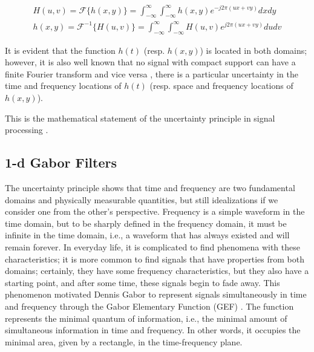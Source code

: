 \documentclass[journal]{IEEEtran}
\begin{document}
\begin{equation}\label{eq:fourier_transforms_2d}
    \begin{gathered}
        H(u, v) = \mathcal{F}\{h(x, y)\} = \int_{-\infty}^{\infty} \int_{-\infty}^{\infty} h(x, y) e^{-j2\pi (ux + vy)} dx dy \\
        h(x, y) = \mathcal{F}^{-1}\{H(u, v)\} = \int_{-\infty}^{\infty} \int_{-\infty}^{\infty}  H(u, v) e^{j2\pi (ux + vy)} du dv 
    \end{gathered}
\end{equation}


It is evident that the function $h(t)$ (resp. $h(x, y)$) is located in both domains; however, it is also well known that no signal with compact support can have a finite Fourier transform and vice versa \cite{Bracewell:FourierBook:1999}, there is a particular uncertainty in the time and frequency locations of $h(t)$ (resp. space and frequency locations of $h(x, y)$).

This is the mathematical statement of the uncertainty principle in signal processing \cite{Petrou.Sevilla:Book:2006}.

\subsection{1-d Gabor Filters}
The uncertainty principle shows that time and frequency are two fundamental domains and physically measurable quantities, but still idealizations if we consider one from the other's perspective. Frequency is a simple waveform in the time domain, but to be sharply defined in the frequency domain, it must be infinite in the time domain, i.e., a waveform that has always existed and will remain forever. In everyday life, it is complicated to find phenomena with these characteristics; it is more common to find signals that have properties from both domains; certainly, they have some frequency characteristics, but they also have a starting point, and after some time, these signals begin to fade away. This phenomenon motivated Dennis Gabor to represent signals simultaneously in time and frequency through the Gabor Elementary Function (GEF) \cite{Gabor:JIEE:1946}. The function represents the minimal quantum of information, i.e., the minimal amount of simultaneous information in time and frequency. In other words, it occupies the minimal area, given by a rectangle, in the time-frequency plane.  
\end{document}
